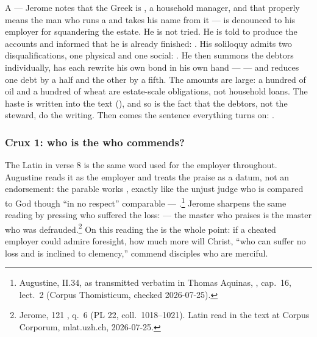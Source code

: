 A  --- Jerome notes that the Greek is , a
household manager, and that  properly means the man who runs a
 and takes his name from it --- is denounced to his employer for
squandering the estate. He is not tried. He is told to produce the accounts and
informed that he is already finished: .
His soliloquy admits two disqualifications, one physical and one social:
. He then summons the debtors
individually, has each rewrite his own bond in his own hand ---  --- and reduces one debt by a half
and the other by a fifth. The amounts are large: a hundred  of oil
and a hundred  of wheat are estate-scale obligations, not household
loans. The haste is written into the text (), and so is the
fact that the debtors, not the steward, do the writing. Then comes the sentence
everything turns on: .

\subsubsection*{Crux 1: who is the  who commends?}

The Latin  in verse 8 is the same word used for the employer
throughout. Augustine reads it as the employer and treats the praise as a
datum, not an endorsement: the parable works , exactly like
the unjust judge who is compared to God though ``in no respect'' comparable ---
.\footnote{
Augustine,  II.34, as transmitted verbatim in
Thomas Aquinas, , cap.\ 16, lect.\ 2 (Corpus
Thomisticum, checked 2026-07-25).} Jerome sharpens the same reading by pressing
who suffered the loss:  --- the master who praises is the master who was
defrauded.\footnote{Jerome,  121 , q.\ 6 (PL
22, coll.\ 1018--1021). Latin read in the  text at
Corpus Corporum, mlat.uzh.ch, 2026-07-25.} On this reading the  is the whole point: if a cheated employer could admire foresight, how
much more will Christ, ``who can suffer no loss and is inclined to clemency,''
commend disciples who are merciful.

